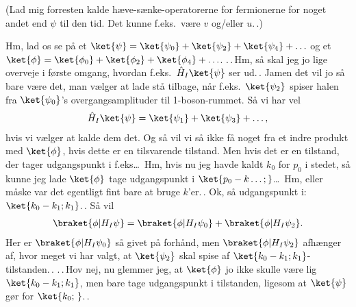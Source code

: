 \documentclass{report}
\begin{document}
(Lad mig forresten kalde hæve-sænke-operatorerne for fermionerne for noget andet end $\psi$ til den tid. Det kunne f.eks.\ være $v$ og/eller $u$.\,.)

Hm, lad os se på et $\ket{\psi} = \ket{\psi_0} + \ket{\psi_2} + \ket{\psi_4} + \ldots$ og et $\ket{\phi} = \ket{\phi_0} + \ket{\phi_2} + \ket{\phi_4} + \ldots$. .\,.\,Hm, så skal jeg jo lige overveje i første omgang, hvordan f.eks.\ $\hat H_I \ket{\psi}$ ser ud.\,. Jamen det vil jo så bare være det, man vælger at lade stå tilbage, når f.eks.\ $\ket{\psi_2}$ spiser halen fra $\ket{\psi_0}$'s overgangsamplituder til 1-boson-rummet. Så vi har vel 
\begin{align}
\begin{aligned}
	\hat H_I \ket{\psi} = \ket{\psi_1} + \ket{\psi_3} + \ldots,
\end{aligned}
\end{align}
hvis vi vælger at kalde dem det. Og så vil vi så ikke få noget fra et indre produkt med $\ket{\phi}$, hvis dette er en tilsvarende tilstand. Men hvis det er en tilstand, der tager udgangspunkt i f.eks\ldots\ Hm, hvis nu jeg havde kaldt $k_0$ for $p_0$ i stedet, så kunne jeg lade $\ket{\phi}$ tage udgangspunkt i  $\ket{p_0 - k\ldots;}$\ldots\ Hm, eller måske var det egentligt fint bare at bruge $k$'er.\,. Ok, så udgangspunkt i: $\ket{k_0 - k_1; k_1}$.\,. Så vil
\begin{align}
\begin{aligned}
	\braket{\phi| H_I \psi} = \braket{\phi| H_I \psi_0}  + \braket{\phi| H_I \psi_2}. 
\end{aligned}
\end{align}
Her er $\braket{\phi| H_I \psi_0}$ så givet på forhånd, men $\braket{\phi| H_I \psi_2}$ afhænger af, hvor meget vi har valgt, at $\ket{\psi_2}$ skal spise af $\ket{k_0 - k_1; k_1}$-tilstanden.\,. .\,.\,Hov nej, nu glemmer jeg, at $\ket{\phi}$ jo ikke skulle være lig $\ket{k_0 - k_1; k_1}$, men bare tage udgangspunkt i tilstanden, ligesom at $\ket{\psi}$ gør for $\ket{k_0; \,}$.\,.
\end{document}
